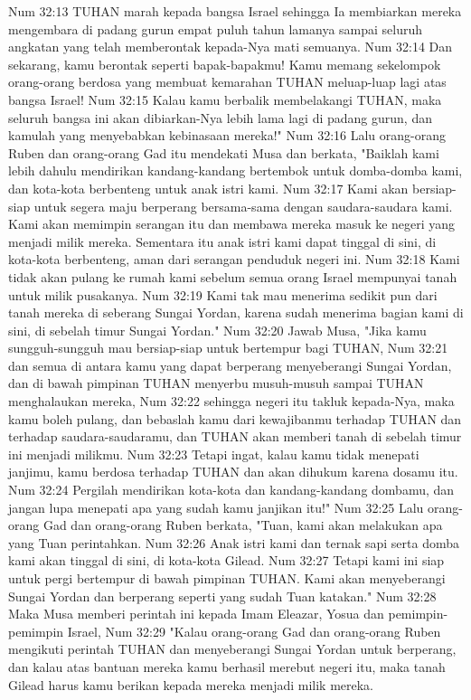 Num 32:13  TUHAN marah kepada bangsa Israel sehingga Ia membiarkan mereka mengembara di padang gurun empat puluh tahun lamanya sampai seluruh angkatan yang telah memberontak kepada-Nya mati semuanya.
Num 32:14  Dan sekarang, kamu berontak seperti bapak-bapakmu! Kamu memang sekelompok orang-orang berdosa yang membuat kemarahan TUHAN meluap-luap lagi atas bangsa Israel!
Num 32:15  Kalau kamu berbalik membelakangi TUHAN, maka seluruh bangsa ini akan dibiarkan-Nya lebih lama lagi di padang gurun, dan kamulah yang menyebabkan kebinasaan mereka!"
Num 32:16  Lalu orang-orang Ruben dan orang-orang Gad itu mendekati Musa dan berkata, "Baiklah kami lebih dahulu mendirikan kandang-kandang bertembok untuk domba-domba kami, dan kota-kota berbenteng untuk anak istri kami.
Num 32:17  Kami akan bersiap-siap untuk segera maju berperang bersama-sama dengan saudara-saudara kami. Kami akan memimpin serangan itu dan membawa mereka masuk ke negeri yang menjadi milik mereka. Sementara itu anak istri kami dapat tinggal di sini, di kota-kota berbenteng, aman dari serangan penduduk negeri ini.
Num 32:18  Kami tidak akan pulang ke rumah kami sebelum semua orang Israel mempunyai tanah untuk milik pusakanya.
Num 32:19  Kami tak mau menerima sedikit pun dari tanah mereka di seberang Sungai Yordan, karena sudah menerima bagian kami di sini, di sebelah timur Sungai Yordan."
Num 32:20  Jawab Musa, "Jika kamu sungguh-sungguh mau bersiap-siap untuk bertempur bagi TUHAN,
Num 32:21  dan semua di antara kamu yang dapat berperang menyeberangi Sungai Yordan, dan di bawah pimpinan TUHAN menyerbu musuh-musuh sampai TUHAN menghalaukan mereka,
Num 32:22  sehingga negeri itu takluk kepada-Nya, maka kamu boleh pulang, dan bebaslah kamu dari kewajibanmu terhadap TUHAN dan terhadap saudara-saudaramu, dan TUHAN akan memberi tanah di sebelah timur ini menjadi milikmu.
Num 32:23  Tetapi ingat, kalau kamu tidak menepati janjimu, kamu berdosa terhadap TUHAN dan akan dihukum karena dosamu itu.
Num 32:24  Pergilah mendirikan kota-kota dan kandang-kandang dombamu, dan jangan lupa menepati apa yang sudah kamu janjikan itu!"
Num 32:25  Lalu orang-orang Gad dan orang-orang Ruben berkata, "Tuan, kami akan melakukan apa yang Tuan perintahkan.
Num 32:26  Anak istri kami dan ternak sapi serta domba kami akan tinggal di sini, di kota-kota Gilead.
Num 32:27  Tetapi kami ini siap untuk pergi bertempur di bawah pimpinan TUHAN. Kami akan menyeberangi Sungai Yordan dan berperang seperti yang sudah Tuan katakan."
Num 32:28  Maka Musa memberi perintah ini kepada Imam Eleazar, Yosua dan pemimpin-pemimpin Israel,
Num 32:29  "Kalau orang-orang Gad dan orang-orang Ruben mengikuti perintah TUHAN dan menyeberangi Sungai Yordan untuk berperang, dan kalau atas bantuan mereka kamu berhasil merebut negeri itu, maka tanah Gilead harus kamu berikan kepada mereka menjadi milik mereka.
